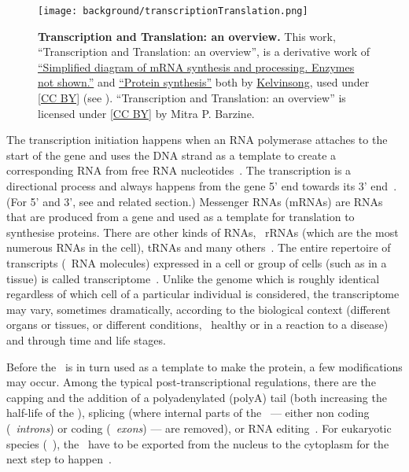 \begin{figure}[!htpb]
    \vspace{-3mm}
    \texttt{[image: background/transcriptionTranslation.png]}\centering
    \vspace{-2.3mm}
    \caption[Transcription and Translation: an overview]%
    {\label{fig:transcriptionTranslation}\textbf{Transcription and Translation: an overview.}
    {\small This work, \enquote{Transcription and Translation: an overview},
    is a derivative work of
    \href{https://commons.wikimedia.org/wiki/File:MRNA.svg}{\enquote{Simplified diagram of mRNA synthesis and processing. Enzymes not shown.}}
    and
    \href{https://commons.wikimedia.org/wiki/File:Protein\_synthesis.svg}{\enquote{Protein synthesis}}
    both by \href{https://commons.wikimedia.org/wiki/User:Kelvinsong}{Kelvinsong},
    used under \href{https://creativecommons.org/licenses/by/3.0/}{[CC BY]}
    (see ).
    \enquote{Transcription and Translation: an overview} is licensed under
    \href{https://creativecommons.org/licenses/by/4.0/}{[CC BY]} by Mitra P. Barzine.
    }}
\end{figure}

The transcription initiation happens when
an \gls{RNA} polymerase attaches to the start of the gene
and uses the \gls{DNA} strand as a template
to create a corresponding \gls{RNA}
from free \gls{RNA} nucleotides~.
The transcription is a directional process and
always happens from the gene 5' end towards its 3' end~.
(For 5' and 3', see  and related section.)
Messenger \glspl{RNA} (\glspl{mRNA}) are \glspl{RNA} that are produced from a gene
and used as a template for translation to synthesise proteins.
There are other kinds of \glspl{RNA},
\eg\ \glspl{rRNA} (which are the most numerous \glspl{RNA} in the cell),
\glspl{tRNA} and many others~.
The entire repertoire of transcripts (\ie\ \gls{RNA} molecules) expressed
in a cell or group of cells (such as in a tissue)
is called transcriptome~.
Unlike the genome which is roughly identical
regardless of which cell of a particular individual is considered,
the transcriptome may vary, sometimes dramatically,
according to the biological context (different organs or tissues,
or different conditions, \eg\ healthy or in a reaction to a disease)
and through time and life stages.~\mybr\

Before the \mRNA\ is in turn used as a template to make the protein,
a few modifications may occur.
Among the typical post-transcriptional regulations,
there are
the capping and the addition of a polyadenylated (polyA) tail
(both increasing the half-life of the \mRNA),
splicing
(where internal parts of the \mRNA\ ---
either non coding (\ie\ \emph{introns}) or coding (\ie\ \emph{exons}) --- are removed),
or \gls{RNA} editing~.
For eukaryotic species (\eg\ ),
the \mRNAs\ have to be exported
from the nucleus to the cytoplasm for the next step to happen~.\mybr\

